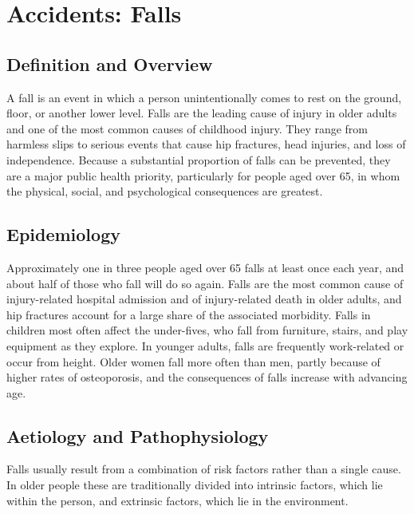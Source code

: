 \chapter{Accidents: Falls}

\section*{Definition and Overview}
A fall is an event in which a person unintentionally comes to rest on the ground, floor, or another lower level. Falls are the leading cause of injury in older adults and one of the most common causes of childhood injury. They range from harmless slips to serious events that cause hip fractures, head injuries, and loss of independence. Because a substantial proportion of falls can be prevented, they are a major public health priority, particularly for people aged over 65, in whom the physical, social, and psychological consequences are greatest.

\section*{Epidemiology}
Approximately one in three people aged over 65 falls at least once each year, and about half of those who fall will do so again. Falls are the most common cause of injury-related hospital admission and of injury-related death in older adults, and hip fractures account for a large share of the associated morbidity. Falls in children most often affect the under-fives, who fall from furniture, stairs, and play equipment as they explore. In younger adults, falls are frequently work-related or occur from height. Older women fall more often than men, partly because of higher rates of osteoporosis, and the consequences of falls increase with advancing age.

\section*{Aetiology and Pathophysiology}
Falls usually result from a combination of risk factors rather than a single cause. In older people these are traditionally divided into intrinsic factors, which lie within the person, and extrinsic factors, which lie in the environment.

